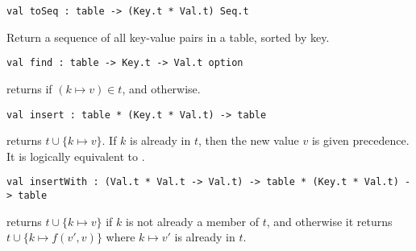\begin{cluster}
\label{grp:grm:aug-ordtable-interface::toseq}

\begin{gram}[toSeq]
\label{grm:aug-ordtable-interface::toseq}
\begin{verbatim}
val toSeq : table -> (Key.t * Val.t) Seq.t
\end{verbatim}
Return a sequence of all key-value pairs in a table, sorted by key.

\end{gram}
\end{cluster}

\begin{cluster}
\label{grp:grm:aug-ordtable-interface::find}

\begin{gram}[find]
\label{grm:aug-ordtable-interface::find}
\begin{verbatim}
val find : table -> Key.t -> Val.t option
\end{verbatim}
 returns  if $(k \mapsto v) \in t$, and 
otherwise.

\end{gram}
\end{cluster}

\begin{cluster}
\label{grp:grm:aug-ordtable-interface::insert}

\begin{gram}[insert]
\label{grm:aug-ordtable-interface::insert}
\begin{verbatim}
val insert : table * (Key.t * Val.t) -> table
\end{verbatim}
 returns $t \cup \{k \mapsto v\}$. If $k$ is already
in $t$, then the new value $v$ is given precedence. It is logically equivalent
to .

\end{gram}
\end{cluster}

\begin{cluster}
\label{grp:grm:aug-ordtable-interface::insertwith}

\begin{gram}[insertWith]
\label{grm:aug-ordtable-interface::insertwith}
\begin{verbatim}
val insertWith : (Val.t * Val.t -> Val.t) -> table * (Key.t * Val.t) -> table
\end{verbatim}
 returns $t \cup \{k \mapsto v\}$ if $k$ is not
already a member of $t$, and otherwise it returns $t \cup \{k \mapsto f(v',v)\}$
where $k \mapsto v'$ is already in $t$.

\end{gram}
\end{cluster}

